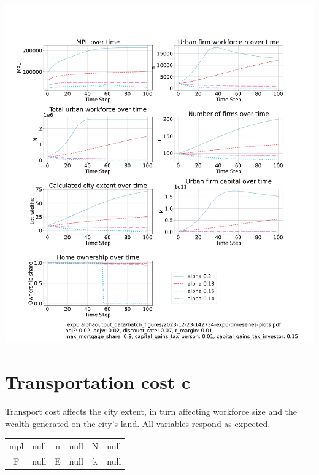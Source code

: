 \documentclass{article}
\begin{document}
 \hspace*{-2.5cm}\includegraphics[trim= 1.5cm 3.65cm 2cm 4.0cm, clip, scale=.3]{fig/Analysis/Alpha-4-30.pdf}

\newpage %

\section{Transportation cost c}
Transport cost affects the city extent, in turn affecting workforce size and the wealth generated on the city's land. All variables respond as expected. 
 
\begin{tabular}{|c|c||c|c||c|c|}
mpl  & null   & n   & null & N   &  null \\
F    & null   & E   &  null  &  k & null
\end{tabular} 
\end{document}

